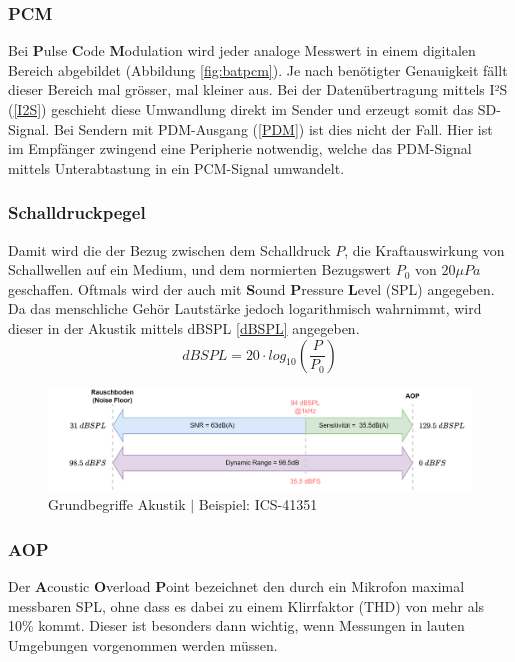 \documentclass[12pt]{article}
\begin{document}
	\subsubsection*{PCM}
	Bei \textbf{P}ulse \textbf{C}ode \textbf{M}odulation wird jeder analoge Messwert in einem digitalen Bereich abgebildet (Abbildung \ref{fig:batpcm}). Je nach benötigter Genauigkeit fällt dieser Bereich mal grösser, mal kleiner aus. Bei der Datenübertragung mittels I²S (\ref{I2S}) geschieht diese Umwandlung direkt im Sender und erzeugt somit das SD-Signal. Bei Sendern mit PDM-Ausgang (\ref{PDM}) ist dies nicht der Fall. Hier ist im Empfänger zwingend eine Peripherie notwendig, welche das PDM-Signal mittels Unterabtastung in ein PCM-Signal umwandelt.
	\subsubsection*{Schalldruckpegel}
	Damit wird die der Bezug zwischen dem Schalldruck \textbf{$P$}, die Kraftauswirkung von Schallwellen auf ein Medium, und dem normierten Bezugswert \textbf{$P_0$} von $20 \mu Pa$ geschaffen. Oftmals wird der auch mit \textbf{S}ound \textbf{P}ressure \textbf{L}evel (SPL) angegeben. Da das menschliche Gehör Lautstärke jedoch logarithmisch wahrnimmt, wird dieser in der Akustik mittels dBSPL \ref{dBSPL} angegeben.
	\begin{equation}\label{dBSPL}
		dBSPL = 20 \cdot log_{10}(\frac{P}{P_0})
	\end{equation}
	\begin{figure}[H]
		\centering
		\includegraphics[width=\linewidth]{images/BAT_PDM_Grundbegriffe}
		\caption{Grundbegriffe Akustik $\vert$ Beispiel: ICS-41351}
		\label{fig:batpdmgrundbegriffe}
	\end{figure}
	\subsubsection*{AOP} \label{AOP}
	Der \textbf{A}coustic \textbf{O}verload \textbf{P}oint bezeichnet den durch ein Mikrofon maximal messbaren SPL, ohne dass es dabei zu einem Klirrfaktor (THD) von mehr als 10\% kommt. Dieser ist besonders dann wichtig, wenn Messungen in lauten Umgebungen vorgenommen werden müssen.
\end{document}
